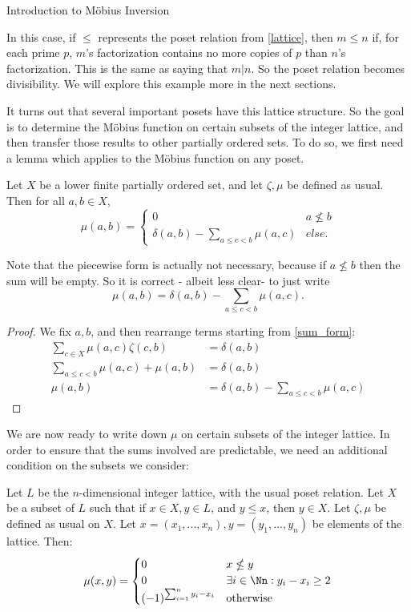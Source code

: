 \documentclass[12pt]{pom_thesis}
\begin{document}
\begin{chapter}{Introduction to M\"obius Inversion}
\begin{examp}
In this case, if $\leq$ represents the poset relation from \ref{lattice}, then $m \leq n$ if, for each prime $p$, $m$'s factorization contains no more copies of $p$ than $n$'s factorization. This is the same as saying that $m|n$. So the poset relation becomes divisibility. We will explore this example more in the next sections.
\end{examp}
It turns out that several important posets have this lattice structure. So the goal is to determine the M\"obius function on certain subsets of the integer lattice, and then transfer those results to other partially ordered sets. To do so, we first need a lemma which applies to the M\"obius function on any poset.
\begin{lemma}\label{recurse}
Let $X$ be a lower finite partially ordered set, and let $\zeta, \mu$ be defined as usual. Then for all $a, b \in X$,
\[
\mu(a,b) = 
\begin{cases}
0 & a \nleq b\\
\delta(a,b)-\sum_{a \leq c < b}\mu(a,c) & else.
\end{cases}
\]
\end{lemma}
\begin{rmk}
Note that the piecewise form is actually not necessary, because if $a \nleq b$ then the sum will be empty. So it is correct - albeit less clear- to just write
\[
\mu(a,b) = \delta(a,b)-\sum_{a \leq c < b}\mu(a,c).
\]
\end{rmk}
\begin{proof}
We fix $a,b$, and then rearrange terms starting from \ref{sum_form}:
\begin{align*}
\sum_{c \in X}\mu(a,c) \zeta(c,b) &= \delta(a,b)\\
\sum_{a \leq c < b} \mu(a,c) + \mu(a,b) &= \delta(a,b)\\
\mu(a,b) &= \delta(a,b) - \sum_{a \leq c < b} \mu(a,c) 
\end{align*}
\end{proof}
We are now ready to write down $\mu$ on certain subsets of the integer lattice. In order to ensure that the sums involved are predictable, we need an additional condition on the subsets we consider:

\begin{lemma}\label{mu_lattice}
Let $L$ be the $n$-dimensional integer lattice, with the usual poset relation. Let $X$ be a subset of $L$ such that if $x \in X, y \in L$, and $y \leq x$, then $y \in X$. Let $\zeta, \mu$ be defined as usual on $X$. Let $x=(x_1,...,x_n),y = (y_1,...,y_n)$ be elements of the lattice. Then:
\[
\mu(x,y) =
\begin{cases}
0 & x\nleq y\\
0 & \exists i \in \Nn: y_i-x_i \geq 2\\
(-1)^{\sum_{i=1}^ny_i-x_i} & \text{otherwise}
\end{cases}
\]
\end{lemma}


\end{chapter}
\end{document}
